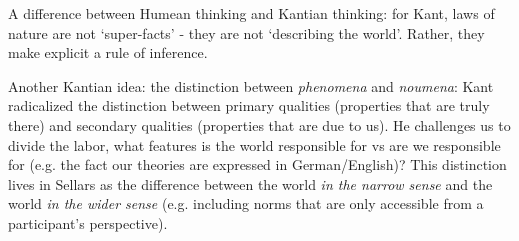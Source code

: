 
A difference between Humean thinking and Kantian thinking: for Kant, laws of nature are not `super-facts' - they are not `describing the world'. Rather, they make explicit a rule of inference.

Another Kantian idea: the distinction between \emph{phenomena} and \emph{noumena}: Kant radicalized the distinction between primary qualities (properties that are truly there) and secondary qualities (properties that are due to us). He challenges us to divide the labor, what features is the world responsible for vs are we responsible for (e.g. the fact our theories are expressed in German/English)? This distinction lives in Sellars as the difference between the world \emph{in the narrow sense} and the world \emph{in the wider sense} (e.g. including norms that are only accessible from a participant's perspective).